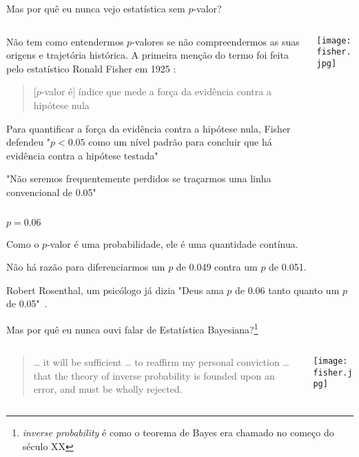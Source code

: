 \begin{frame}{Mas por quê eu nunca vejo estatística sem $p$-valor?}
	\begin{columns}
		\begin{column}{0.8\textwidth}
			Não tem como entendermos $p$-valores se não compreendermos as suas
			origens e trajetória histórica. A primeira menção do termo foi feita
			pelo estatístico Ronald Fisher em 1925 \parencite{fisher1925statistical}:
			\begin{quotation}
				[$p$-valor é] índice que mede a força da evidência contra a hipótese nula
			\end{quotation}
			\begin{vfilleditems}
				\item Para quantificar a força da evidência contra a hipótese nula, Fisher defendeu
				"$p<0.05$ como um nível padrão para concluir que há evidência contra a hipótese testada"
				\item "Não seremos frequentemente perdidos se traçarmos uma linha convencional de 0.05"
			\end{vfilleditems}
		\end{column}
		\begin{column}{0.2\textwidth}
			\centering
			\texttt{[image: fisher.jpg]}
		\end{column}
	\end{columns}
\end{frame}

\begin{frame}{$p = 0.06$}
	\begin{vfilleditems}
		\item Como o $p$-valor é uma probabilidade, ele é uma quantidade contínua.
		\item Não há razão para diferenciarmos um $p$ de 0.049 contra um $p$ de 0.051.
		\item Robert Rosenthal, um psicólogo já dizia "Deus ama $p$ de 0.06 tanto quanto um $p$ de 0.05"~\parencite{rosnow1989statistical}.
	\end{vfilleditems}
\end{frame}

\begin{frame}{Mas por quê eu nunca ouvi falar de Estatística Bayesiana?\footnote{\textit{inverse probability} é como o teorema de Bayes era chamado no começo do século XX}}
	\begin{columns}
		\begin{column}{0.8\textwidth}
			\begin{quotation}
				… it will be sufficient … to reaffirm my personal conviction …
				that the theory of inverse probability is founded upon an error,
				and must be wholly rejected.
			\end{quotation}
			\vfill \vfill
			\textcite{fisher1925statistical}
		\end{column}
		\begin{column}{0.2\textwidth}
			\centering
			\texttt{[image: fisher.jpg]}
		\end{column}
	\end{columns}
\end{frame}

